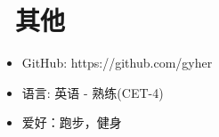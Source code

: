\documentclass{resume}
\begin{document}

\section{\faInfo\ 其他}\normalsize
\begin{itemize}[parsep=0.5ex]
  \item GitHub: https://github.com/gyher
  \item 语言: 英语 - 熟练(CET-4)
  \item 爱好：跑步，健身
\end{itemize}

%
%
\end{document}
